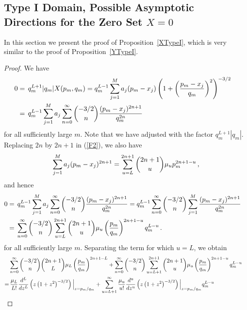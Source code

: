 \documentclass{article}
\theoremstyle{remark}
\numberwithin{equation}{section}
\begin{document}
\subsection{Type I Domain, Possible Asymptotic Directions for the Zero Set $X=0$}\label{SecXTypeI}

In this section we present the proof of Proposition~\ref{XTypeI}, which is very similar to the proof of Proposition~\ref{YTypeI}.

\begin{proof}
We have
\begin{equation} \notag
\begin{split}
0 & =  \,  q_m^{L+1}|q_m| X(p_m,q_m) =  q_m^{L-1}\sum_{j=1}^M{a_j(p_m-x_j)\left(1 + \left( \frac{p_m-x_j}{q_m} \right)^2 \right)^{-3/2}} \cr
& = \, q_m^{L-1} \sum_{j=1}^M{a_j \sum_{n=0}^\infty{\binom{-3/2}{n} \frac{(p_m-x_j)^{2n+1}}{q_m^{2n}}}} \cr
\end{split}
\end{equation}
for all sufficiently large $m$. Note that we have adjusted with the factor $q_m^{L+1}|q_m|$. Replacing $2n$ by $2n+1$ in (\ref{F2}), we also have
\begin{equation} \notag
\sum_{j=1}^M{a_j(p_m-x_j)^{2n+1}} = \sum_{u=L}^{2n+1}{\binom {2n+1}{u} \mu_u p_m^{2n+1-u}}\,,
\end{equation}
and hence
\begin{equation} \notag \begin{split}
0 & = \, q_m^{L-1} \sum_{j=1}^M{a_j \sum_{n=0}^\infty{\binom{-3/2}{n} \frac{(p_m-x_j)^{2n+1}}{q_m^{2n}}}}
= q_m^{L-1}\sum_{n=0}^\infty{ \binom{-3/2}{n} \sum_{j=1}^M{ \frac{(p_m-x_j)^{2n+1}}{q_m^{2n}}}} \cr
& = \, \sum_{n=0}^\infty{\binom {-3/2}{n} \sum_{u=L}^{2n+1}{\binom{2n+1}{u} \mu_u \left( \frac{p_m}{q_m} \right)^{2n+1-u} q_m^{L-u}}}\,. \cr
\end{split}\end{equation}
for all sufficiently large $m$. Separating the term for which $u=L$, we obtain
\begin{equation} \label{F7}
\begin{split}
& \sum_{n=0}^\infty{\binom {-3/2}{n} {\binom{2n+1}{L} \mu_L \left( \frac{p_m}{q_m} \right)^{2n+1-L}}}
+ \sum_{n=0}^\infty{\binom {-3/2}{n} \sum_{u=L+1}^{2n+1}{\binom{2n+1}{u} \mu_u \left( \frac{p_m}{q_m} \right)^{2n+1-u} q_m^{L-u}}} \cr
= & \, \frac{\mu_L}{L!} \frac{d^L}{dz^L} \left( z \left( 1 + z^2 \right)^{-3/2} \right) \Big|_{z = p_m/q_m}
+ \sum_{u=L+1}^\infty{\frac{\mu_u}{u!} \frac{d^u}{dz^u} \left( z \left( 1 + z^2 \right)^{-3/2} \right) \Big|_{z = p_m/q_m}} q_m^{L-u} \cr

\end{split}
\end{equation}
\end{proof}
\end{document}
